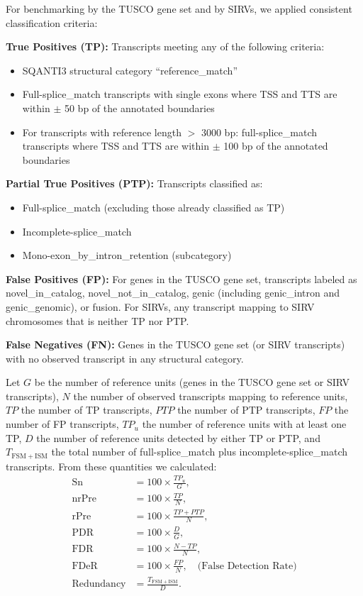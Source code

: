\documentclass[pdflatex,sn-nature]{sn-jnl}%
\newcommand{\tuscoGeneSet}{TUSCO gene set}
\begin{document}
For benchmarking by the \tuscoGeneSet{} and by SIRVs, we applied consistent classification criteria:

\textbf{True Positives (TP):} Transcripts meeting any of the following criteria:
\begin{itemize}
  \item SQANTI3 structural category ``reference\_match''
  \item Full-splice\_match transcripts with single exons where TSS and TTS are within $\pm$ 50 bp of the annotated boundaries
  \item For transcripts with reference length $>$ 3000 bp: full-splice\_match transcripts where TSS and TTS are within $\pm$ 100 bp of the annotated boundaries
\end{itemize}

\textbf{Partial True Positives (PTP):} Transcripts classified as:
\begin{itemize}
  \item Full-splice\_match (excluding those already classified as TP)
  \item Incomplete-splice\_match
  \item Mono-exon\_by\_intron\_retention (subcategory)
\end{itemize}

\textbf{False Positives (FP):} For genes in the \tuscoGeneSet{}, transcripts labeled as novel\_in\_catalog, novel\_not\_in\_catalog, genic (including genic\_intron and genic\_genomic), or fusion. For SIRVs, any transcript mapping to SIRV chromosomes that is neither TP nor PTP.

\textbf{False Negatives (FN):} Genes in the \tuscoGeneSet{} (or SIRV transcripts) with no observed transcript in any structural category.

Let $G$ be the number of reference units (genes in the \tuscoGeneSet{} or SIRV transcripts), $N$ the number of observed transcripts mapping to reference units, $TP$ the number of TP transcripts, $PTP$ the number of PTP transcripts, $FP$ the number of FP transcripts, $TP_{u}$ the number of reference units with at least one TP, $D$ the number of reference units detected by either TP or PTP, and $T_{\mathrm{FSM+ISM}}$ the total number of full-splice\_match plus incomplete-splice\_match transcripts. From these quantities we calculated:
\begin{align}
\mathrm{Sn} &= 100 \times \frac{TP_{u}}{G}, \\
\mathrm{nrPre} &= 100 \times \frac{TP}{N}, \\
\mathrm{rPre} &= 100 \times \frac{TP + PTP}{N}, \\
\mathrm{PDR} &= 100 \times \frac{D}{G}, \\
\mathrm{FDR} &= 100 \times \frac{N - TP}{N}, \\
\mathrm{FDeR} &= 100 \times \frac{FP}{N}, \quad \text{(False Detection Rate)} \\
\mathrm{Redundancy} &= \frac{T_{\mathrm{FSM+ISM}}}{D}.\end{align}
\end{document}
